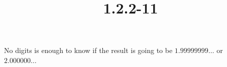 \documentclass{article}
\title{1.2.2-11}
\begin{document}
\maketitle

No digits is enough to know if the result is going to be $1.99999999\ldots$ or $2.000000\ldots$
\end{document}

